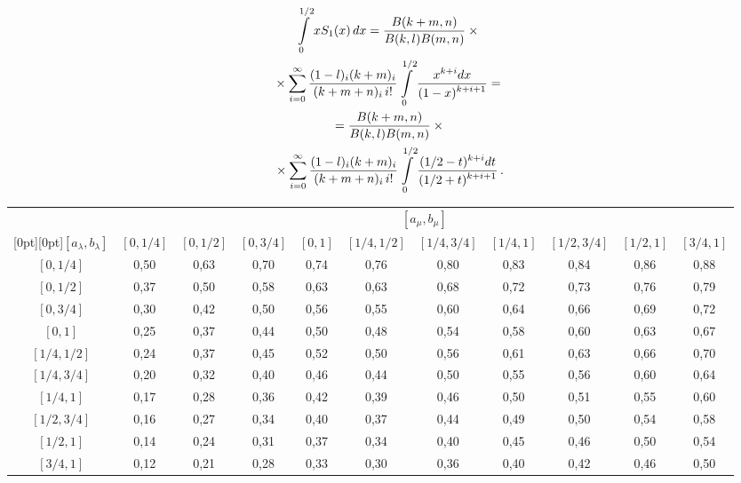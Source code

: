 \begin{multicols}{2}
\noindent
\begin{multline*}
\int\limits_{0}^{1/2}xS_1(x)\,dx=
\displaystyle\frac{\displaystyle B(k+m,n)\mathstrut}{\displaystyle B(k,l)B(m,n)\mathstrut}\times{}\\
{}\times
\sum\limits_{i=0}^\infty \displaystyle\frac{\displaystyle (1-l)_i(k+m)_i\mathstrut}{\displaystyle (k+m+n)_i\,i!\mathstrut}
\int\limits_{0}^{1/2} \displaystyle\frac{\displaystyle x^{k+i}dx\mathstrut}{\displaystyle (1-x)^{k+i+1}\mathstrut}={}\\
{}=
\displaystyle\frac{\displaystyle B(k+m,n)\mathstrut}{\displaystyle B(k,l)B(m,n)\mathstrut}\times{}\\
{}\times \sum\limits_{i=0}^\infty
\displaystyle\frac{\displaystyle (1-l)_i(k+m)_i\mathstrut}{\displaystyle (k+m+n)_i\,i!\mathstrut}\int\limits_{0}^{1/2}
\displaystyle\frac{\displaystyle (1/2-t)^{k+i}dt\mathstrut}{\displaystyle (1/2+t) ^{k+i+1}\mathstrut}\,.
\end{multline*}
\begin{table*}[b]\small %
\vspace*{-12pt}
\begin{center}
\vspace*{2ex}

\tabcolsep=5pt
\begin{tabular}{|c|c|c|c|c|c|c|c|c|c|c|}
\hline
&\multicolumn{10}{c|}{$[a_\mu,b_\mu]$}\\
\cline{2-11}
\multicolumn{1}{|c|}{\raisebox{6pt}[0pt][0pt]{$[a_\lambda,b_\lambda]$}}&$[0,1/4]$&$[0,1/2]$&$[0,3/4]$&$[0,1]$&$[1/4,1/2]$&$[1/4,3/4]$&$[1/4,1]$&$[1/2,3/4]$&$[1/2,1]$&$[3/4,1]$\\
\hline
$[0,1/4]$&0,50&0,63&0,70&0,74&0,76&0,80&0,83&0,84&0,86&0,88\\
$[0,1/2]$&0,37&0,50&0,58&0,63&0,63&0,68&0,72&0,73&0,76&0,79\\
$[0,3/4]$&0,30&0,42&0,50&0,56&0,55&0,60&0,64&0,66&0,69&0,72\\
$[0,1]$&0,25&0,37&0,44&0,50&0,48&0,54&0,58&0,60&0,63&0,67\\
$[1/4,1/2]$&0,24&0,37&0,45&0,52&0,50&0,56&0,61&0,63&0,66&0,70\\
$[1/4,3/4]$&0,20&0,32&0,40&0,46&0,44&0,50&0,55&0,56&0,60&0,64\\
$[1/4,1]$&0,17&0,28&0,36&0,42&0,39&0,46&0,50&0,51&0,55&0,60\\
$[1/2,3/4]$&0,16&0,27&0,34&0,40&0,37&0,44&0,49&0,50&0,54&0,58\\
$[1/2,1]$&0,14&0,24&0,31&0,37&0,34&0,40&0,45&0,46&0,50&0,54\\
$[3/4,1]$&0,12&0,21&0,28&0,33&0,30&0,36&0,40&0,42&0,46&0,50\\
\hline
\end{tabular}
\end{center}
\end{table*}
\begin{table*}\small %
\begin{center}
\vspace*{2ex}


\end{center}
\end{table*}
\end{multicols}
